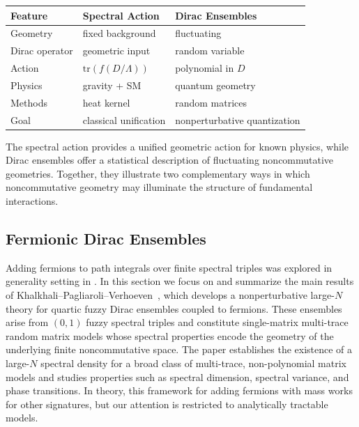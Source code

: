 \documentclass[11pt]{article}
\theoremstyle{plain}
\begin{document}
\begin{center}
\begin{tabular}{lll}
\hline
\textbf{Feature} & \textbf{Spectral Action} & \textbf{Dirac Ensembles} \\
\hline
Geometry & fixed background & fluctuating \\
Dirac operator & geometric input & random variable \\
Action & $\mathrm{tr}(f(D/\Lambda))$ & polynomial in $D$ \\
Physics & gravity + SM & quantum geometry \\
Methods & heat kernel & random matrices \\
Goal & classical unification & nonperturbative quantization \\
\hline
\end{tabular}
\end{center}

The spectral action provides a unified geometric action for known physics, while Dirac
ensembles offer a statistical description of fluctuating noncommutative geometries.
Together, they illustrate two complementary ways in which noncommutative geometry may
illuminate the structure of fundamental interactions.









\subsection{Fermionic Dirac Ensembles}
\label{sec:summary-fuzzy-fermionic}

Adding fermions to path integrals over finite spectral triples was explored in generality setting in \cite{Barrett2024}. In this section we focus on and summarize the main results of
Khalkhali--Pagliaroli--Verhoeven~\cite{Khalkhali2025 large N limit},
which develops a nonperturbative large-$N$ theory for quartic fuzzy Dirac
ensembles coupled to fermions.  
These ensembles arise from $(0,1)$ fuzzy spectral triples and constitute
single-matrix multi-trace random matrix models whose spectral properties 
encode the geometry of the underlying finite noncommutative space.  
The paper establishes the existence of a large-$N$ spectral density for a 
broad class of multi-trace, non-polynomial matrix models and studies 
properties such as spectral dimension, spectral variance, and 
phase transitions. In theory, this framework for adding fermions with mass works for other signatures, but our attention is restricted to analytically tractable models.
\end{document}
